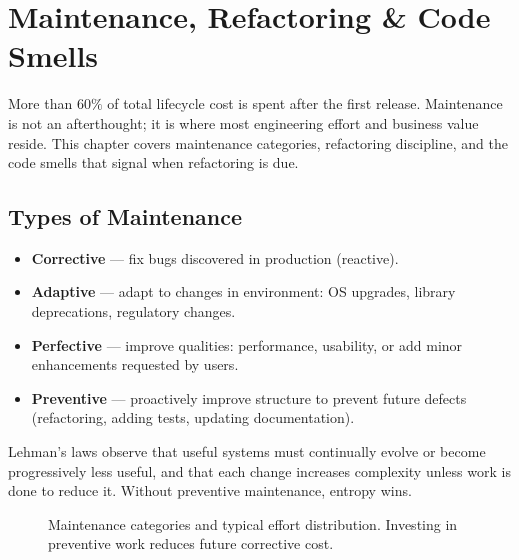 \chapter{Maintenance, Refactoring \& Code Smells}
\label{ch:maintenance}

More than $60\%$ of total lifecycle cost is spent after the first release. Maintenance is not an afterthought; it is where most engineering effort and business value reside. This chapter covers maintenance categories, refactoring discipline, and the code smells that signal when refactoring is due.

\section{Types of Maintenance}

\begin{itemize}
    \item \textbf{Corrective} --- fix bugs discovered in production (reactive).
    \item \textbf{Adaptive} --- adapt to changes in environment: OS upgrades, library deprecations, regulatory changes.
    \item \textbf{Perfective} --- improve qualities: performance, usability, or add minor enhancements requested by users.
    \item \textbf{Preventive} --- proactively improve structure to prevent future defects (refactoring, adding tests, updating documentation).
\end{itemize}

Lehman's laws observe that useful systems must continually evolve or become progressively less useful, and that each change increases complexity unless work is done to reduce it. Without preventive maintenance, entropy wins.

\begin{figure}[h]
\centering
{}
\caption{Maintenance categories and typical effort distribution. Investing in preventive work reduces future corrective cost.}
\end{figure}

